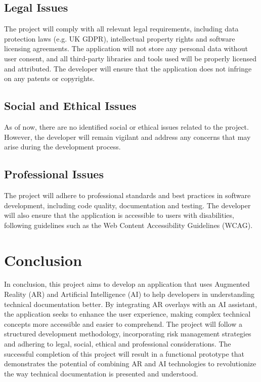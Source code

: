 \documentclass[12pt]{article}
\begin{document}
    \subsection{Legal Issues}
        The project will comply with all relevant legal requirements, including data protection laws (e.g. UK GDPR), intellectual property rights and software licensing agreements. The application
        will not store any personal data without user consent, and all third-party libraries and tools used will be properly licensed and attributed. The developer will ensure that the application does not infringe on any patents or copyrights.

    \subsection{Social and Ethical Issues}
        As of now, there are no identified social or ethical issues related to the project. However, the developer will remain vigilant and address any concerns that may arise during the development process.

    \subsection{Professional Issues}
        The project will adhere to professional standards and best practices in software development, including code quality, documentation and testing. The developer will also ensure that the application is accessible to users with disabilities, following guidelines such as the Web Content Accessibility Guidelines (WCAG).
        
\section{Conclusion}

    In conclusion, this project aims to develop an application that uses Augmented Reality (AR) and Artificial Intelligence (AI) to help developers in understanding technical documentation better. By
    integrating AR overlays with an AI assistant, the application seeks to enhance the user experience, making complex technical concepts more accessible and easier to comprehend. The project will follow
    a structured development methodology, incorporating risk management strategies and adhering to legal, social, ethical and professional considerations. The successful completion of this project will result
    in a functional prototype that demonstrates the potential of combining AR and AI technologies to revolutionize the way technical documentation is presented and understood.
\end{document}
